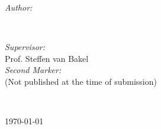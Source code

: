 \begin{titlepage}
\begin{minipage}{0.4\textwidth}
\begin{flushleft} \large
\emph{Author:}\\
\@author %
\end{flushleft}
\end{minipage}
~
\begin{minipage}{0.4\textwidth}
\begin{flushright} \large
\emph{Supervisor:} \\
Prof. Steffen van Bakel \\[1.2em] %
\emph{Second Marker:} \\
(Not published at the time of submission) %
\end{flushright}
\end{minipage}\\[2cm]
\makeatother



{\large \today}\\[2cm] %

\vfill %

\end{titlepage}